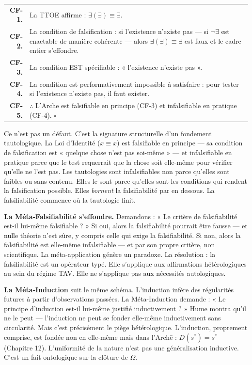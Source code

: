 \documentclass[10pt, openany, oneside]{book}
\renewcommand{\footnotesize}{\fontsize{8.5}{11}\selectfont}
\begin{document}
{\footnotesize
\noindent\begin{tabular}{r p{}}
\textbf{CF-1.} & La TTOE affirme : $\exists(\exists) \equiv \exists$. \\[0.3em]
\textbf{CF-2.} & La condition de falsification : si l'existence n'existe pas --- si $\neg\exists$ est enactable de manière cohérente --- alors $\exists(\exists) \equiv \exists$ est faux et le cadre entier s'effondre. \\[0.3em]
\textbf{CF-3.} & La condition EST spécifiable : « l'existence n'existe pas ». \\[0.3em]
\textbf{CF-4.} & La condition est performativement impossible à satisfaire : pour tester si l'existence n'existe pas, il faut exister. \\[0.3em]
\textbf{CF-5.} & $\therefore$ L'Arch\={e} est falsifiable en principe (CF-3) et infalsifiable en pratique (CF-4). $\square$ \\[0.3em]
\end{tabular}
}

\vspace{0.8em}

\noindent Ce n'est pas un défaut. C'est la signature structurelle d'un fondement tautologique. La Loi d'Identité ($x \equiv x$) est falsifiable en principe --- sa condition de falsification est « quelque chose n'est pas soi-même » --- et infalsifiable en pratique parce que le test requerrait que la chose soit elle-même pour vérifier qu'elle ne l'est pas. Les tautologies sont infalsifiables non parce qu'elles sont faibles ou sans contenu. Elles le sont parce qu'elles sont les conditions qui rendent la falsification possible. Elles \textit{bornent} la falsifiabilité par en dessous. La falsifiabilité commence où la tautologie finit.

\textbf{La Méta-Falsifiabilité s'effondre.} Demandons : « Le critère de falsifiabilité est-il lui-même falsifiable ? » Si oui, alors la falsifiabilité pourrait être fausse --- et nulle théorie n'est sûre, y compris celle qui exige la falsifiabilité. Si non, alors la falsifiabilité est elle-même infalsifiable --- et par son propre critère, non scientifique. La méta-application génère un paradoxe. La résolution : la falsifiabilité est un opérateur typé. Elle s'applique aux affirmations hétérologiques au sein du régime TAV. Elle ne s'applique pas aux nécessités autologiques.

\textbf{La Méta-Induction} suit le même schéma. L'induction infère des régularités futures à partir d'observations passées. La Méta-Induction demande : « Le principe d'induction est-il lui-même justifié inductivement ? » Hume montra qu'il ne le peut --- l'induction ne peut se fonder elle-même inductivement sans circularité. Mais c'est précisément le piège hétérologique. L'induction, proprement comprise, est fondée non en elle-même mais dans l'Arch\={e} : $D(s^*) = s^*$ (Chapitre 12). L'uniformité de la nature n'est pas une généralisation inductive. C'est un fait ontologique sur la clôture de $\Omega$.
\end{document}
